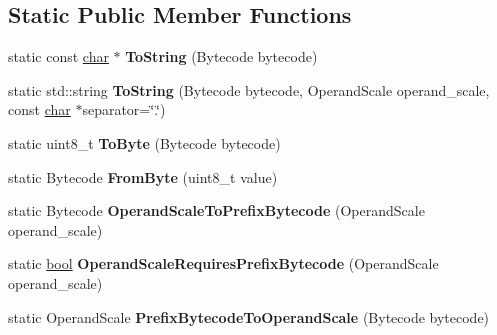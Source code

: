 \subsection*{Static Public Member Functions}
\begin{DoxyCompactItemize}
\item 
\mbox{\label{classv8_1_1internal_1_1interpreter_1_1Bytecodes_ae3e76b6c1aba4e2cfafd4c53594607ba}} 
static const \mbox{\hyperlink{classchar}{char}} $\ast$ {\bfseries To\+String} (Bytecode bytecode)
\item 
\mbox{\label{classv8_1_1internal_1_1interpreter_1_1Bytecodes_aa843e0823e9233b3061cac0b96e15a21}} 
static std\+::string {\bfseries To\+String} (Bytecode bytecode, Operand\+Scale operand\+\_\+scale, const \mbox{\hyperlink{classchar}{char}} $\ast$separator=\char`\"{}.\char`\"{})
\item 
\mbox{\label{classv8_1_1internal_1_1interpreter_1_1Bytecodes_a8aaeb7fc182c7d6411c78e3d410c1e2d}} 
static uint8\+\_\+t {\bfseries To\+Byte} (Bytecode bytecode)
\item 
\mbox{\label{classv8_1_1internal_1_1interpreter_1_1Bytecodes_a22d68671271e53b89b5fcba4b9e3ac4a}} 
static Bytecode {\bfseries From\+Byte} (uint8\+\_\+t value)
\item 
\mbox{\label{classv8_1_1internal_1_1interpreter_1_1Bytecodes_a6150d0c67dad07020c2a5f44f5a80adb}} 
static Bytecode {\bfseries Operand\+Scale\+To\+Prefix\+Bytecode} (Operand\+Scale operand\+\_\+scale)
\item 
\mbox{\label{classv8_1_1internal_1_1interpreter_1_1Bytecodes_ac6c2453c929fa7792f2ba781ec93b306}} 
static \mbox{\hyperlink{classbool}{bool}} {\bfseries Operand\+Scale\+Requires\+Prefix\+Bytecode} (Operand\+Scale operand\+\_\+scale)
\item 
\mbox{\label{classv8_1_1internal_1_1interpreter_1_1Bytecodes_a29cdb52cd593cad434aafc4fbeba57c9}} 
static Operand\+Scale {\bfseries Prefix\+Bytecode\+To\+Operand\+Scale} (Bytecode bytecode)

\end{DoxyCompactItemize}
